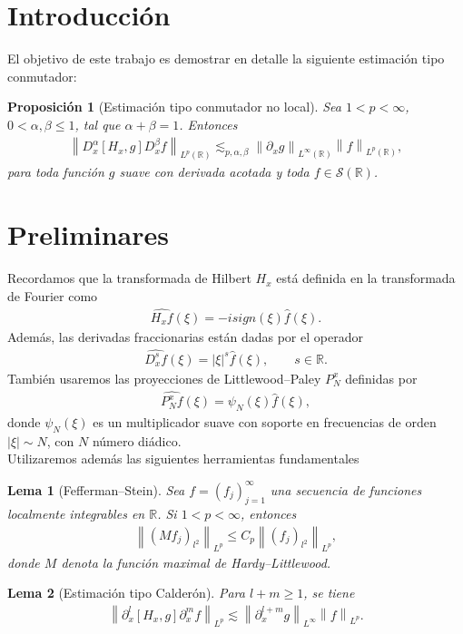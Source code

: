 \documentclass{aleph-revista}
\newtheorem{proposition}{Proposición}
\newtheorem{lemma}{Lema}
\renewcommand{\hat}{\widehat}
\providecommand{\norm}[1]{\left\|#1\right\|}
\begin{document}
\membrete
\section{Introducción}
El objetivo de este trabajo es demostrar en detalle la siguiente estimación tipo conmutador:
\begin{proposition}[Estimación tipo conmutador no local]
Sea $1 < p < \infty$, $0 < \alpha, \beta \leq 1$, tal que $\alpha + \beta = 1$. Entonces
\begin{align*}
  \norm{D_x^{\alpha} [H_x, g] D_x^{\beta} f}_{L^p(\mathbb{R})} \lesssim_{p,\alpha,\beta} \norm{\partial_x g}_{L^\infty(\mathbb{R})}\norm{f}_{L^p(\mathbb{R})}, 
\end{align*}
para toda función $g$ suave con derivada acotada y toda $f \in \mathcal{S}(\mathbb{R})$.
\end{proposition}
\section{Preliminares}
Recordamos que la transformada de Hilbert $H_x$ está definida en la transformada de Fourier como
\begin{align*}
  \hat{H_x f}(\xi) = -isign(\xi) \hat{f}(\xi). 
\end{align*}
Además, las derivadas fraccionarias están dadas por el operador
\begin{align*}
  \hat{D_x^s f}(\xi) = |\xi|^s \hat{f}(\xi), \qquad s \in \mathbb{R}. 
\end{align*}
También usaremos las proyecciones de Littlewood–Paley $P^x_N$ definidas por
\begin{align*}
  \hat{P^x_N f}(\xi) = \psi_N(\xi) \hat{f}(\xi), 
\end{align*}
donde $\psi_N(\xi)$ es un multiplicador suave con soporte en frecuencias de orden $|\xi| \sim N$, con $N$ número diádico.\\
Utilizaremos además las siguientes herramientas fundamentales
\begin{lemma}[Fefferman–Stein]
  Sea $f = (f_j)_{j=1}^{\infty}$ una secuencia de funciones localmente integrables en $\mathbb{R}$. Si $1 < p < \infty$, entonces
  \begin{align*}
    \norm{(Mf_j)_{l^2}}_{L^p} \leq C_p \norm{(f_j)_{l^2}}_{L^p}, 
  \end{align*}
  donde $M$ denota la función maximal de Hardy–Littlewood.
\end{lemma}
\begin{lemma}[Estimación tipo Calderón]
  Para $l + m \geq 1$, se tiene
  \begin{align*}
    \norm{\partial_x^l [H_x, g] \partial_x^m f}_{L^p} \lesssim \norm{\partial_x^{l + m} g}_{L^\infty} \norm{f}_{L^p}. 
  \end{align*}
\end{lemma}
\end{document}
